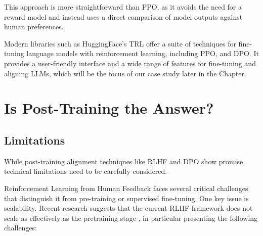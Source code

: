 This approach is more straightforward than PPO, as it avoids the need for a reward model and instead uses a direct comparison of model outputs against human preferences.

Modern libraries such as HuggingFace's TRL  offer a suite of techniques for fine-tuning language models with reinforcement learning, including PPO, and DPO. It provides a user-friendly interface and a wide range of features for fine-tuning and aligning LLMs, which will be the focus of our case study later in the Chapter.

\section{Is Post-Training the Answer?}

\subsection{Limitations}

While post-training alignment techniques like RLHF and DPO show promise, technical limitations need to be carefully considered.

Reinforcement Learning from Human Feedback faces several critical challenges that distinguish it from pre-training or supervised fine-tuning. One key issue is scalability. Recent research suggests that the current RLHF framework does not scale as effectively as the pretraining stage , in particular presenting the following challenges:

